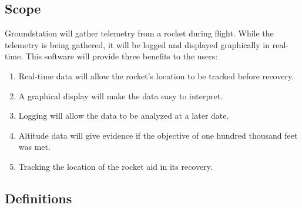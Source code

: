 \documentclass[10pt,journal,draftclsnofoot,onecolumn]{IEEEtran}
\begin{document}
	\subsection{Scope}
	Groundstation will gather telemetry from a rocket during flight.
	While the telemetry is being gathered, it will be logged and displayed graphically in real-time.
	This software will provide three benefits to the users:
	\begin{enumerate}
		\item Real-time data will allow the rocket's location to be tracked before recovery.
		\item A graphical display will make the data easy to interpret.
		\item Logging will allow the data to be analyzed at a later date.
		\item Altitude data will give evidence if the objective of one hundred thousand feet was met.
		\item Tracking the location of the rocket aid in its recovery.
	\end{enumerate}	
			
	\subsection{Definitions}
	
\end{document}
